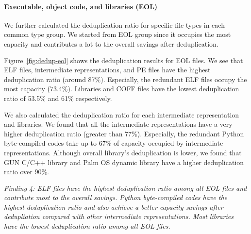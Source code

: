 \paragraph{Executable, object code, and libraries (EOL)}
We further calculated the deduplication ratio for specific file types in each common type group. We started from EOL group since it occupies the most capacity and contributes a lot to the overall savings after deduplication. 

Figure~\ref{fig:dedup-eol} shows the deduplication results for EOL files.
We see that ELF files, intermediate representations, and PE files have the highest deduplication ratio (around 87\%). Especially, the redundant ELF files occupy the most capacity (73.4\%). 
Libraries and COFF files have the lowest deduplication ratio of 53.5\% and 61\% respectively.

We also calculated the deduplication ratio for each intermediate representation and libraries. We found that all the intermediate representations have a very higher deduplication ratio (greater than 77\%). Especially, the redundant Python byte-compiled codes take up to 67\% of capacity occupied by intermediate representations. Although overall library's deduplication is lower, we found that GUN C/C++ library and Palm OS dynamic library have a higher deduplication ratio over 90\%.

\textit{Finding 4: ELF files have the highest deduplication ratio among all EOL files and contribute most to the overall savings. Python byte-compiled codes have the highest deduplication ratio and also achieve a better capacity savings after dedupliation compared with other intermediate representations. Most libraries have the lowest deduplication ratio among all EOL files.}

%

